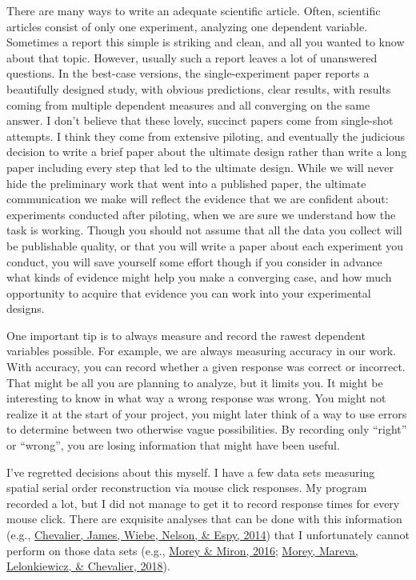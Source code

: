 \documentclass[
  12pt,
]{book}
\begin{document}
There are many ways to write an adequate scientific article. Often, scientific articles consist of only one experiment, analyzing one dependent variable. Sometimes a report this simple is striking and clean, and all you wanted to know about that topic. However, usually such a report leaves a lot of unanswered questions. In the best-case versions, the single-experiment paper reports a beautifully designed study, with obvious predictions, clear results, with results coming from multiple dependent measures and all converging on the same answer. I don't believe that these lovely, succinct papers come from single-shot attempts. I think they come from extensive piloting, and eventually the judicious decision to write a brief paper about the ultimate design rather than write a long paper including every step that led to the ultimate design. While we will never hide the preliminary work that went into a published paper, the ultimate communication we make will reflect the evidence that we are confident about: experiments conducted after piloting, when we are sure we understand how the task is working. Though you should not assume that all the data you collect will be publishable quality, or that you will write a paper about each experiment you conduct, you will save yourself some effort though if you consider in advance what kinds of evidence might help you make a converging case, and how much opportunity to acquire that evidence you can work into your experimental designs.

One important tip is to always measure and record the rawest dependent variables possible. For example, we are always measuring accuracy in our work. With accuracy, you can record whether a given response was correct or incorrect. That might be all you are planning to analyze, but it limits you. It might be interesting to know in what way a wrong response was wrong. You might not realize it at the start of your project, you might later think of a way to use errors to determine between two otherwise vague possibilities. By recording only ``right'' or ``wrong'', you are losing information that might have been useful.

I've regretted decisions about this myself. I have a few data sets measuring spatial serial order reconstruction via mouse click responses. My program recorded a lot, but I did not manage to get it to record response times for every mouse click. There are exquisite analyses that can be done with this information (e.g., \href{10.1037/a0036644}{Chevalier, James, Wiebe, Nelson, \& Espy, 2014}) that I unfortunately cannot perform on those data sets (e.g., \href{10.1037/xlm0000280}{Morey \& Miron, 2016}; \href{10.1111/desc.12559}{Morey, Mareva, Lelonkiewicz, \& Chevalier, 2018}).
\end{document}
